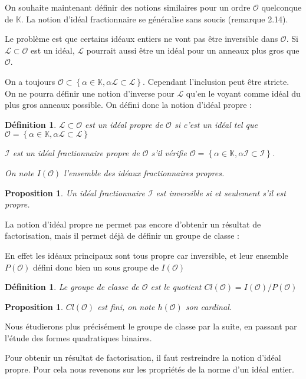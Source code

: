 \documentclass{article}
\newcommand{\K}[0]{\mathbb{K}}
\newcommand{\OR}[0]{\mathcal{O}}
\newcommand{\LR}[0]{\mathcal{L}}
\newcommand{\IR}[0]{\mathcal{I}}
\newtheorem{Prop}[The]{Proposition}
\newtheorem{Def}[The]{Définition}
\begin{document}
On souhaite maintenant définir des notions similaires pour un ordre $\OR$ quelconque de $\K$. La notion d'idéal fractionnaire se généralise sans soucis (remarque 2.14).

Le problème est que certains idéaux entiers ne vont pas être inversible dans $\OR$. Si $\LR\subset\OR$ est un idéal, $\LR$ pourrait aussi être un idéal pour un anneaux plus gros que $\OR$. 

On a toujours $\OR\subset\left\lbrace \alpha\in\K, \alpha\LR\subset\LR\right\rbrace$. Cependant l'inclusion peut être stricte. On ne pourra définir une notion d'inverse pour $\LR$ qu'en le voyant comme idéal du plus gros anneaux possible. On défini donc la notion d'idéal propre :

\begin{Def}
	$\LR\subset\OR$ est un idéal propre de $\OR$ si c'est un idéal tel que $\OR = \left\lbrace \alpha\in\K, \alpha\LR\subset\LR\right\rbrace$
	
	$\IR$ est un idéal fractionnaire propre de $\OR$ s'il vérifie $\OR = \left\lbrace \alpha\in\K, \alpha\IR\subset\IR\right\rbrace$.
	
	On note $I(\OR)$ l'ensemble des idéaux fractionnaires propres.
\end{Def}

\begin{Prop}
	Un idéal fractionnaire $\IR$ est inversible si et seulement s'il est propre.
\end{Prop}

La notion d'idéal propre ne permet pas encore d'obtenir un résultat de factorisation, mais il permet déjà de définir un groupe de classe :

En effet les idéaux principaux sont tous propre car inversible, et leur ensemble $P(\OR)$ défini donc bien un sous groupe de $I(\OR)$

\begin{Def}
	Le groupe de classe de $\OR$ est le quotient $Cl(\OR) =  I(\OR)/P(\OR)$
\end{Def}

\begin{Prop}
	$Cl(\OR)$ est fini, on note $h(\OR)$ son cardinal. 
\end{Prop} 

Nous étudierons plus précisément le groupe de classe par la suite, en passant par l'étude des formes quadratiques binaires. 

Pour obtenir un résultat de factorisation, il faut restreindre la notion d'idéal propre. Pour cela nous revenons sur les propriétés de la norme d'un idéal entier.
\end{document}
